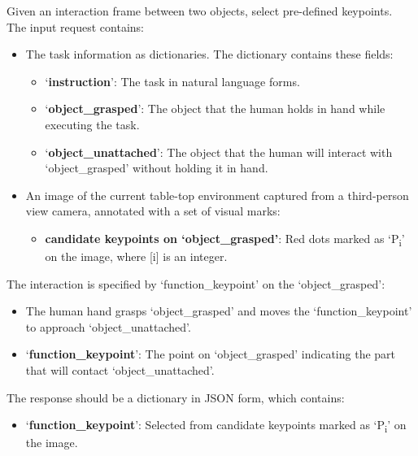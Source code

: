 \begin{center}
\begin{tcolorbox}[colback=gray!5, colframe=black!40, sharp corners=south, title= Function Point Detection Prompt]\small

Given an interaction frame between two objects, select pre-defined keypoints. \\

The input request contains:  
\begin{itemize}
    \item The task information as dictionaries. The dictionary contains these fields: 
    \begin{itemize}
        \item `\textbf{instruction}': The task in natural language forms.
        \item `\textbf{object\_grasped}': The object that the human holds in hand while executing the task.
        \item `\textbf{object\_unattached}': The object that the human will interact with `object\_grasped' without holding it in hand.
    \end{itemize}
    \item  An image of the current table-top environment captured from a third-person view camera, annotated with a set of visual marks:
    \begin{itemize}
        \item \textbf{candidate keypoints on `object\_grasped'}: Red dots marked as `P\textsubscript{i}' on the image, where [i] is an integer. \\
    \end{itemize}
\end{itemize}

The interaction is specified by `function\_keypoint' on the `object\_grasped':
\begin{itemize}
    \item The human hand grasps `object\_grasped' and moves the `function\_keypoint' to approach `object\_unattached'.
    \item `\textbf{function\_keypoint}': The point on `object\_grasped' indicating the part that will contact `object\_unattached'. \\
\end{itemize}

The response should be a dictionary in JSON form, which contains:
\begin{itemize}
    \item `\textbf{function\_keypoint}': Selected from candidate keypoints marked as `P\textsubscript{i}' on the image.\\
\end{itemize}


\end{tcolorbox}
\end{center}
